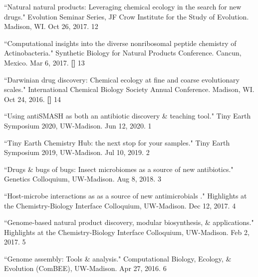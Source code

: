 \begin{cvpubs}
\cvpub
{``Natural natural products: Leveraging chemical ecology in the search for new drugs." Evolution Seminar Series, JF Crow Institute for the Study of Evolution. Madison, WI. Oct 26, 2017.}
{12}

\cvpub
{``Computational insights into the diverse nonribosomal peptide chemistry of Actinobacteria." Synthetic Biology for Natural Products Conference. Cancun, Mexico. Mar 6, 2017. \linebreak \textbf{[\textit{}]}}
{13}

\cvpub
{``Darwinian drug discovery: Chemical ecology at fine and coarse evolutionary scales." International Chemical Biology Society Annual Conference. Madison, WI. Oct 24, 2016. \linebreak \textbf{[\textit{}]}}
{14}

\end{cvpubs}


 \vspace{-2mm}

\begin{cvpubs} 


\cvpub
{``Using antiSMASH as both an antibiotic discovery \& teaching tool." Tiny Earth Symposium 2020, UW-Madison. Jun 12, 2020.}
{1}

\cvpub
{``Tiny Earth Chemistry Hub: the next stop for your samples." Tiny Earth Symposium 2019, UW-Madison. Jul 10, 2019.}
{2}

\cvpub
{``Drugs \& bugs of bugs: Insect microbiomes as a source of new antibiotics." Genetics Colloquium, UW-Madison. Aug 8, 2018.}
{3}

\cvpub
{``Host-microbe interactions as as a source of new antimicrobials
." Highlights at the Chemistry-Biology Interface Colloquium, UW-Madison. Dec 12, 2017.}
{4}

\cvpub
{``Genome-based natural product discovery, modular biosynthesis, \& applications." Highlights at the Chemistry-Biology Interface Colloquium, UW-Madison. Feb 2, 2017.}
{5}

\cvpub
{``Genome assembly: Tools \& analysis." Computational Biology, Ecology, \& Evolution (ComBEE), UW-Madison. Apr 27, 2016.}
{6}

\end{cvpubs}

